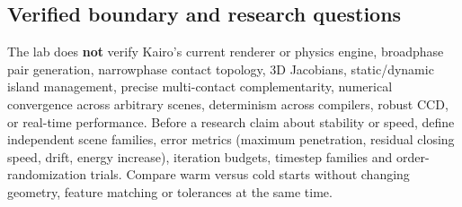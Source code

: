 \subsection{Verified boundary and research questions}\label{appendix-c9d92e145503-verified-boundary-and-research-questions}

The lab does \textbf{not} verify Kairo's current renderer or physics engine, broadphase pair generation, narrowphase contact topology, 3D Jacobians, static/dynamic island management, precise multi-contact complementarity, numerical convergence across arbitrary scenes, determinism across compilers, robust CCD, or real-time performance. Before a research claim about stability or speed, define independent scene families, error metrics (maximum penetration, residual closing speed, drift, energy increase), iteration budgets, timestep families and order-randomization trials. Compare warm versus cold starts without changing geometry, feature matching or tolerances at the same time.

